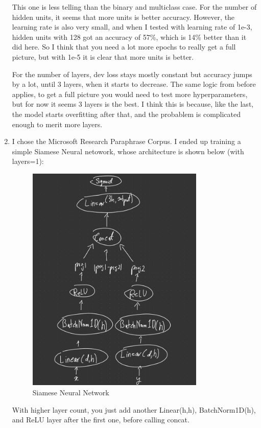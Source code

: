 \documentclass[12pt]{article}
\theoremstyle{definitionstyle}
\begin{document}
\begin{enumerate}
        This one is less telling than the binary and multiclass case. For the number of hidden units, it seems that more units is better accuracy. However, the learning rate is also very small, and when I tested with learning rate of 1e-3, hidden units with 128 got an accuracy of 57\%, which is 14\% better than it did here. So I think that you need a lot more epochs to really get a full picture, but with 1e-5 it is clear that more units is better.

        For the number of layers, dev loss stays mostly constant but accuracy jumps by a lot, until 3 layers, when it starts to decrease. The same logic from before applies, to get a full picture you would need to test more hyperparameters, but for now it seems 3 layers is the best. I think this is because, like the last, the model starts overfitting after that, and the probablem is complicated enough to merit more layers. 

        \item I chose the Microsoft Research Paraphrase Corpus. I ended up training a simple Siamese Neural netowork, whose architecture is shown below (with layers=1):
        \begin{figure}[H]
            \centering
            \includegraphics[width=0.8\textwidth]{images/nn_architecture.jpg}
            \caption{Siamese Neural Network}
        \end{figure}
        With higher layer count, you just add another Linear(h,h), BatchNorm1D(h), and ReLU layer after the first one, before calling concat. 


\end{enumerate}
\end{document}
